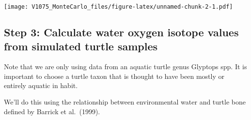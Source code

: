 \documentclass[
]{article}
\newenvironment{Shaded}{\begin{snugshade}}{\end{snugshade}}
\newcommand{\AttributeTok}[1]{\textcolor[rgb]{0.77,0.63,0.00}{#1}}
\newcommand{\CommentTok}[1]{\textcolor[rgb]{0.56,0.35,0.01}{\textit{#1}}}
\newcommand{\DecValTok}[1]{\textcolor[rgb]{0.00,0.00,0.81}{#1}}
\newcommand{\FloatTok}[1]{\textcolor[rgb]{0.00,0.00,0.81}{#1}}
\newcommand{\FunctionTok}[1]{\textcolor[rgb]{0.00,0.00,0.00}{#1}}
\newcommand{\NormalTok}[1]{#1}
\newcommand{\OtherTok}[1]{\textcolor[rgb]{0.56,0.35,0.01}{#1}}
\newcommand{\SpecialCharTok}[1]{\textcolor[rgb]{0.00,0.00,0.00}{#1}}
\newcommand{\StringTok}[1]{\textcolor[rgb]{0.31,0.60,0.02}{#1}}
\begin{document}
\begin{Shaded}
\end{Shaded}

\texttt{[image: V1075\_MonteCarlo\_files/figure-latex/unnamed-chunk-2-1.pdf]}

\hypertarget{step-3-calculate-water-oxygen-isotope-values-from-simulated-turtle-samples}{%
\subsection{Step 3: Calculate water oxygen isotope values from simulated
turtle
samples}\label{step-3-calculate-water-oxygen-isotope-values-from-simulated-turtle-samples}}

Note that we are only using data from an aquatic turtle genus Glyptops
spp. It is important to choose a turtle taxon that is thought to have
been mostly or entirely aquatic in habit.

We'll do this using the relationship between environmental water and
turtle bone defined by Barrick et al.~(1999).
\end{document}
